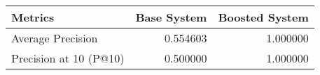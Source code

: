 \begin{tabular}{lrr}
\toprule
Metrics & Base System & Boosted System \\
\midrule
Average Precision & 0.554603 & 1.000000 \\
Precision at 10 (P@10) & 0.500000 & 1.000000 \\
\bottomrule
\end{tabular}
